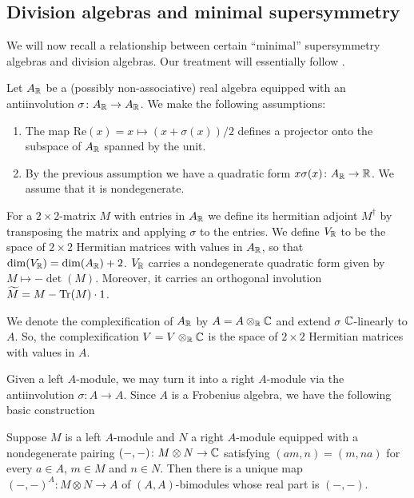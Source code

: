 \documentclass[10pt, oneside]{article}
\renewcommand{\Re}{\mathrm{Re}}
\begin{document}
\subsection{Division algebras and minimal supersymmetry}
\label{sect:divisionalgebras}

We will now recall a relationship between certain ``minimal'' supersymmetry algebras and division algebras. Our treatment will essentially follow \cite{BaezHuerta}.

Let $A_\mathbb R$ be a (possibly non-associative) real algebra equipped with an antiinvolution $\sigma\colon A_\mathbb R\rightarrow A_\mathbb R$. We make the following assumptions:
\begin{enumerate}
\item The map $\Re(x)=x\mapsto (x + \sigma(x))/2$ defines a projector onto the subspace of $A_\mathbb R$ spanned by the unit.

\item By the previous assumption we have a quadratic form $x\sigma(x)\colon A_\mathbb R\rightarrow \mathbb R$. We assume that it is nondegenerate.
\end{enumerate}

For a $2\times 2$-matrix $M$ with entries in $A_\mathbb R$ we define its hermitian adjoint $M^\dagger$ by transposing the matrix and applying $\sigma$ to the entries. We define $V_\mathbb R$ to be the space of $2\times 2$ Hermitian matrices with values in $A_\mathbb R$, so that $\dim(V_\mathbb R) = \dim(A_\mathbb R) + 2$. $V_\mathbb R$ carries a nondegenerate quadratic form given by $M\mapsto -\det(M)$. Moreover, it carries an orthogonal involution $\widetilde{M} = M - \operatorname{Tr}(M)\cdot 1$.

We denote the complexification of $A_\mathbb R$ by $A=A\otimes_\mathbb R \mathbb C$ and extend $\sigma$ $\mathbb C$-linearly to $A$. So, the complexification $V=V\otimes_\mathbb R\mathbb C$ is the space of $2\times 2$ Hermitian matrices with values in $A$.

Given a left $A$-module, we may turn it into a right $A$-module via the antiinvolution $\sigma\colon A\rightarrow A$. Since $A$ is a Frobenius algebra, we have the following basic construction 

\begin{lemma}
Suppose $M$ is a left $A$-module and $N$ a right $A$-module equipped with a nondegenerate pairing $(-, -)\colon M\otimes N\rightarrow \mathbb C$ satisfying $(am, n) = (m, na)$ for every $a\in A$, $m\in M$ and $n\in N$. Then there is a unique map $(-, -)^A\colon M\otimes N\rightarrow A$ of $(A, A)$-bimodules whose real part is $(-, -)$.
\label{lm:extendpairing}
\end{lemma}
\end{document}
